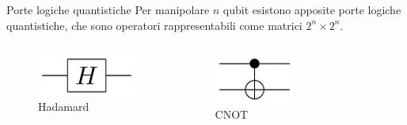 \documentclass{beamer}
\begin{document}
    \begin{frame}{Porte logiche quantistiche}
        Per manipolare $n$ qubit esistono apposite porte logiche quantistiche, 
        che sono operatori rappresentabili come matrici $2^n\times2^n$. 
        \begin{columns}
            \begin{figure}[]
                \centering
                \includegraphics[width=\textwidth]{gfx/Hadamard_gate}
                \caption{Hadamard}
                \label{}
            \end{figure}
            \begin{figure}[]
                \centering
                \includegraphics[width=\textwidth]{gfx/CNOT_gate}                
                \caption{CNOT}
                \label{}
            \end{figure}
            \begin{figure}[]
                \centering

\end{figure}
\end{columns}
\end{frame}
\end{document}
